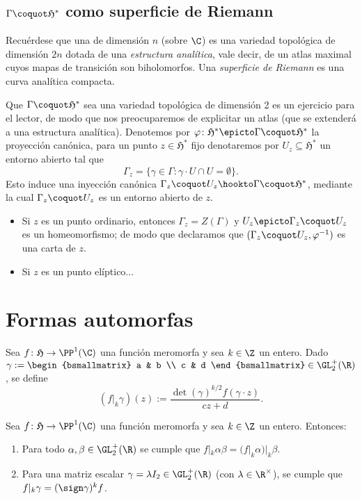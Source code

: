\documentclass[teoria-numeros.tex]{subfiles}
\begin{document}
\subsection*{$\Gamma \coquot \mathfrak{H}^*$ como superficie de Riemann}
Recuérdese que una  de dimensión $n$ (sobre $\C$) es una variedad topológica de dimensión $2n$
dotada de una \emph{estructura analítica}, vale decir, de un atlas maximal cuyos mapas de transición son biholomorfos.
Una \emph{superficie de Riemann} es una curva analítica compacta.

Que $\Gamma \coquot \mathfrak{H}^*$ sea una variedad topológica de dimensión 2 es un ejercicio para el lector, de modo que nos preocuparemos
de explicitar un atlas (que se extenderá a una estructura analítica).
Denotemos por $\varphi \colon \mathfrak{H}^* \epicto \Gamma \coquot \mathfrak{H}^*$ la proyección canónica,
para un punto $z \in \mathfrak{H}^*$ fijo denotaremos por $U_z \subseteq \mathfrak{H}^*$ un entorno abierto tal que
\[
	\Gamma_z = \{ \gamma \in \Gamma : \gamma\cdot U \cap U = \emptyset \}.
\]
Esto induce una inyección canónica $\Gamma_z \coquot U_z \hookto \Gamma \coquot \mathfrak{H}^*$,
mediante la cual $\Gamma_z \coquot U_z$ es un entorno abierto de $z$.
\begin{itemize}
	\item Si $z$ es un punto ordinario, entonces $\Gamma_z = Z(\Gamma)$ y $U_z \epicto \Gamma_z \coquot U_z$ es un homeomorfismo;
		de modo que declaramos que $(\Gamma_z \coquot U_z, \varphi^{-1})$ es una carta de $z$.
	\item Si $z$ es un punto elíptico...
\end{itemize}

\section{Formas automorfas}
\begin{mydef}
	Sea $f \colon \mathfrak{H} \to \PP^1(\C)$ una función meromorfa y sea $k \in \Z$ un entero.
	Dado $\gamma :=
	\begin{bsmallmatrix}
		a & b \\
		c & d
	\end{bsmallmatrix} \in \GL_2^+(\R)$, se define
	\[
		(f|_k \gamma)(z) := \frac{\det(\gamma)^{k/2} f(\gamma\cdot z)}{cz + d}.
	\]
\end{mydef}
\begin{cor}
	Sea $f \colon \mathfrak{H} \to \PP^1(\C)$ una función meromorfa y sea $k \in \Z$ un entero. Entonces:
	\begin{enumerate}
		\item Para todo $\alpha, \beta \in \GL_2^+(\R)$ se cumple que $f|_k \alpha \beta = (f|_k \alpha)|_k \beta$.
		\item Para una matriz escalar $\gamma = \lambda I_2 \in \GL_2^+(\R)$ (con $\lambda \in \R^\times$),
			se cumple que $f|_k \gamma = (\sign\gamma)^k f$.
	\end{enumerate}
\end{cor}
\end{document}
